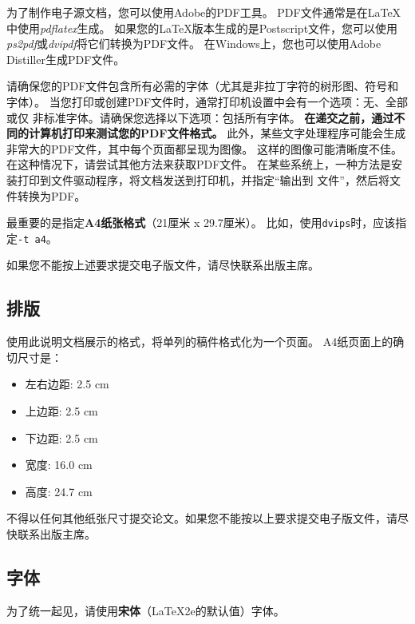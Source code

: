 \documentclass[11pt]{article}
\begin{document}
\begin{CJK*}{UTF8}{gbsn}
为了制作电子源文档，您可以使用Adobe的PDF工具。 PDF文件通常是在\LaTeX{}中使用\textit{pdflatex}生成。
如果您的\LaTeX{}版本生成的是Postscript文件，您可以使用\textit{ps2pdf}或\textit {dvipdf}将它们转换为PDF文件。
在Windows上，您也可以使用Adobe Distiller生成PDF文件。

请确保您的PDF文件包含所有必需的字体（尤其是非拉丁字符的树形图、符号和字体）。
当您打印或创建PDF文件时，通常打印机设置中会有一个选项：无、全部或仅
非标准字体。请确保您选择以下选项：包括所有字体。 
\textbf{在递交之前，通过不同的计算机打印来测试您的PDF文件格式。}
此外，某些文字处理程序可能会生成非常大的PDF文件，其中每个页面都呈现为图像。
这样的图像可能清晰度不佳。在这种情况下，请尝试其他方法来获取PDF文件。
在某些系统上，一种方法是安装打印到文件驱动程序，将文档发送到打印机，并指定“输出到
文件”，然后将文件转换为PDF。

最重要的是指定\textbf{A4纸张格式}（21厘米 x 29.7厘米）。
比如，使用{\tt dvips}时，应该指定{\tt -t a4}。

如果您不能按上述要求提交电子版文件，请尽快联系出版主席。

\subsection{排版}
\label{ssec:layout}

使用此说明文档展示的格式，将单列的稿件格式化为一个页面。 
A4纸页面上的确切尺寸是：

\begin{itemize}
\item 左右边距: 2.5 cm
\item 上边距: 2.5 cm
\item 下边距: 2.5 cm
\item 宽度: 16.0 cm
\item 高度: 24.7 cm
\end{itemize}

\noindent 不得以任何其他纸张尺寸提交论文。如果您不能按以上要求提交电子版文件，请尽快联系出版主席。


\subsection{字体}

为了统一起见，请使用{\bf 宋体}（\LaTeX2e{}的默认值）字体。


\end{CJK*}
\end{document}
